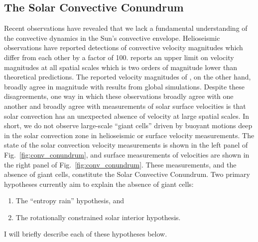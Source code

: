 \subsection{The Solar Convective Conundrum}
\label{sct:convective_conundrum}
Recent observations have revealed that we lack a fundamental understanding of the convective dynamics in the Sun's convective envelope.
Helioseismic observations \citep{hanasoge&all2012, greer&all2015} have reported detections of convective velocity magnitudes which differ from each other by a factor of 100.
\citet{hanasoge&all2012} reports an upper limit on velocity magnitudes at all spatial scales which is two orders of magnitude lower than theoretical predictions.
The reported velocity magnitudes of \citet{greer&all2015}, on the other hand, broadly agree in magnitude with results from global simulations.
Despite these disagreements, one way in which these observations broadly agree with one another and broadly agree with measurements of solar surface velocities \citep{hathaway&all2015} is that solar convection has an unexpected absence of velocity at large spatial scales.
In short, we do not observe large-scale ``giant cells'' driven by buoyant motions deep in the solar convection zone in helioseismic or surface velocity measurements.
The state of the solar convection velocity measurements is shown in the left panel of Fig.~\ref{fig:conv_conundrum}, and surface measurements of velocities are shown in the right panel of Fig.~\ref{fig:conv_conundrum}.
These measurements, and the absence of giant cells, constitute the Solar Convective Conundrum.
Two primary hypotheses currently aim to explain the absence of giant cells: 
\begin{enumerate}
\item The ``entropy rain'' hypothesis, and
\item The rotationally constrained solar interior hypothesis.
\end{enumerate}
I will briefly describe each of these hypotheses below.

